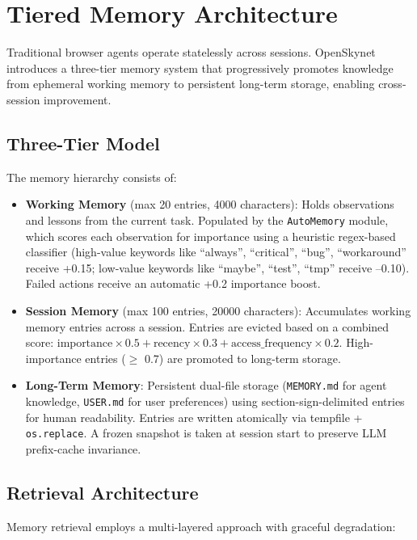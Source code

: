 \section{Tiered Memory Architecture}
\label{sec:memory}

Traditional browser agents operate statelessly across sessions. OpenSkynet introduces a three-tier memory system that progressively promotes knowledge from ephemeral working memory to persistent long-term storage, enabling cross-session improvement.

\subsection{Three-Tier Model}

The memory hierarchy consists of:

\begin{itemize}[leftmargin=*,itemsep=1pt]
    \item \textbf{Working Memory} (max 20 entries, 4000 characters): Holds observations and lessons from the current task. Populated by the \texttt{AutoMemory} module, which scores each observation for importance using a heuristic regex-based classifier (high-value keywords like ``always'', ``critical'', ``bug'', ``workaround'' receive +0.15; low-value keywords like ``maybe'', ``test'', ``tmp'' receive --0.10). Failed actions receive an automatic +0.2 importance boost.
    \item \textbf{Session Memory} (max 100 entries, 20000 characters): Accumulates working memory entries across a session. Entries are evicted based on a combined score: $\text{importance} \times 0.5 + \text{recency} \times 0.3 + \text{access\_frequency} \times 0.2$. High-importance entries ($\geq$ 0.7) are promoted to long-term storage.
    \item \textbf{Long-Term Memory}: Persistent dual-file storage (\texttt{MEMORY.md} for agent knowledge, \texttt{USER.md} for user preferences) using section-sign-delimited entries for human readability. Entries are written atomically via tempfile + \texttt{os.replace}. A frozen snapshot is taken at session start to preserve LLM prefix-cache invariance.
\end{itemize}

\subsection{Retrieval Architecture}

Memory retrieval employs a multi-layered approach with graceful degradation:

